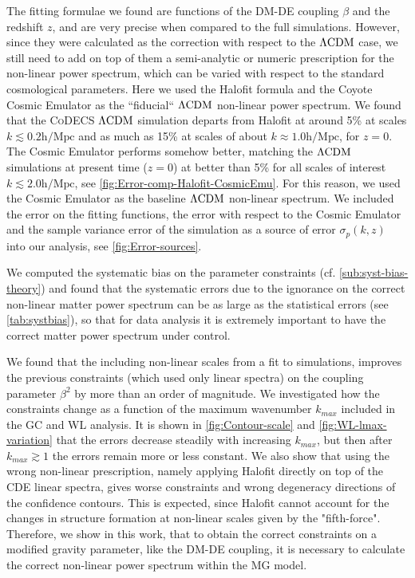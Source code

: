 The fitting formulae we found are functions of the DM-DE coupling $\beta$ and the redshift $z$, and are very precise when compared to the  full simulations.
However, since they were calculated as the correction with respect to the $\Lambda\mathrm{CDM}$ case, 
we still need to add on top of them a semi-analytic or numeric prescription for the non-linear power spectrum, which
can be varied with respect to the standard cosmological parameters.
Here we used the Halofit formula and the Coyote Cosmic Emulator as the ``fiducial`` $\Lambda\mathrm{CDM}$ non-linear power spectrum. 
We found that the \textsc{CoDECS} $\Lambda\mathrm{CDM}$ simulation departs from Halofit at around 5\% 
at scales $k \lesssim 0.2 \mathrm{h/Mpc}$ and as much as 15\% at scales of about $k \approx 1.0 \mathrm{h/Mpc}$, for $z=0$.
The Cosmic Emulator performs somehow better, matching the $\Lambda\mathrm{CDM}$ simulations at present time ($z=0$) at better than 5\%
for all scales of interest $k \lesssim 2.0 \mathrm{h/Mpc}$, see \cref{fig:Error-comp-Halofit-CosmicEmu}. 
For this reason, we used the Cosmic Emulator as the baseline $\Lambda\mathrm{CDM}$ non-linear spectrum.
We included the error on the fitting functions, the error with respect to the Cosmic Emulator and the sample variance error
of the simulation as a source of error $\sigma_p(k,z)$ into our analysis, see \cref{fig:Error-sources}.

We computed the systematic bias on the parameter constraints (cf. \cref{sub:syst-bias-theory}) and 
found that the systematic errors due to the ignorance on the correct non-linear matter power spectrum can be as large as the statistical errors
(see \cref{tab:systbias}),
so that for data analysis it is extremely important to have the correct matter power spectrum under control.

We found that the including non-linear scales from a fit to simulations, improves the previous constraints (which used only linear spectra) on the coupling parameter $\beta^2$ 
by more than an order of magnitude. 
We investigated how the constraints change as a function of the maximum wavenumber $k_{max}$ included in the GC and WL analysis.
It is shown in \cref{fig:Contour-scale} and \cref{fig:WL-lmax-variation} that the errors decrease steadily with increasing $k_{max}$,
but then after $k_{max} \gtrsim 1$ the errors remain more or less constant.
We also show that using the wrong non-linear prescription, namely applying Halofit directly on top of the CDE linear spectra,
gives worse constraints and wrong degeneracy directions of the confidence contours. This is expected, since Halofit cannot account for the 
changes in structure formation at non-linear scales given by the "fifth-force".
Therefore, we show in this work, that to obtain the correct constraints on a modified gravity parameter, like the DM-DE coupling, 
it is necessary to calculate the correct non-linear power spectrum within the MG model.

